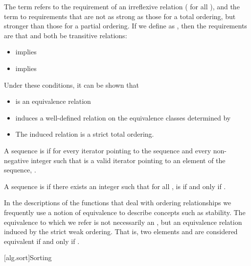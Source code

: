 \pnum
The term
refers to the
requirement of an irreflexive relation ( for all ),
and the term
to requirements that are not as strong as
those for a total ordering,
but stronger than those for a partial
ordering.
If we define
as
,
then the requirements are that
and
both be transitive  relations:

\begin{itemize}
\item
{}
implies
\item
{}
implies
\end{itemize}
\begin{note}
Under these conditions, it can be shown that
\begin{itemize}
\item
{}
is an equivalence relation
\item
{}
induces a well-defined relation on the equivalence
classes determined by
\item
The induced relation is a strict total ordering.
\end{itemize}
\end{note}

\pnum
A sequence is
 if for every iterator
pointing to the sequence and every non-negative integer
such that
is a valid iterator pointing to an element of the sequence,
.

\pnum
A sequence
is
if there exists an integer
such that for all
,
is  if and only if
.

\pnum
In the descriptions of the functions that deal with ordering relationships we frequently use a notion of
equivalence to describe concepts such as stability.
The equivalence to which we refer is not necessarily an
,
but an equivalence relation induced by the strict weak ordering.
That is, two elements
and
are considered equivalent if and only if
.

[alg.sort]{Sorting}

